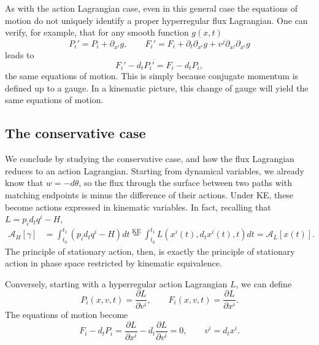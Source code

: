 \documentclass[12pt]{article}
\begin{document}
As with the action Lagrangian case, even in this general case the equations of motion do not uniquely identify a proper hyperregular flux Lagrangian. One can verify, for example, that for any smooth function $g(x,t)$
\begin{equation}
	P_i'=P_i+\partial_{x^i}g,
	\qquad
	F_i'=F_i+\partial_t\partial_{x^i}g
	+v^j\partial_{x^j}\partial_{x^i}g
\end{equation}
leads to
\begin{equation}	F_i'-d_tP_i'=F_i-d_tP_i,
\end{equation}
the same equations of motion. This is simply because conjugate momentum is defined up to a gauge. In a kinematic picture, this change of gauge will yield the same equations of motion.

\subsection{The conservative case}

We conclude by studying the conservative case, and how the flux Lagrangian reduces to an action Lagrangian. Starting from dynamical variables, we already know that $w=-d\theta$, so the flux through the
surface between two paths with matching endpoints is minus the difference of their actions.
Under KE, these become actions expressed in kinematic variables. In fact, recalling that $L = p_i d_t q^i - H$,
\begin{equation}
	\begin{aligned}
		\mathcal{A}_H[\gamma] 
		&= \int_{t_0}^{t_1} ( p_i d_t q^i - H) dt  \stackrel{\text{KE}}{=} \int_{t_0}^{t_1} L(x^i(t), d_t x^i(t), t) dt = \mathcal{A}_L[x(t)].
	\end{aligned}
\end{equation}
The principle of stationary action, then, is exactly the principle of stationary action in phase space restricted by kinematic equivalence.

Conversely, starting with a hyperregular action Lagrangian $L$, we can define
\begin{equation}
	P_i(x,v,t)=\frac{\partial L}{\partial v^i},
	\qquad
	F_i(x,v,t)=\frac{\partial L}{\partial x^i}.
\end{equation}
The equations of motion become
\begin{equation}
	F_i-d_tP_i
	=
	\frac{\partial L}{\partial x^i}
	-
	d_t\frac{\partial L}{\partial v^i}
	=0,
	\qquad v^i=d_tx^i.
\end{equation}
\end{document}
